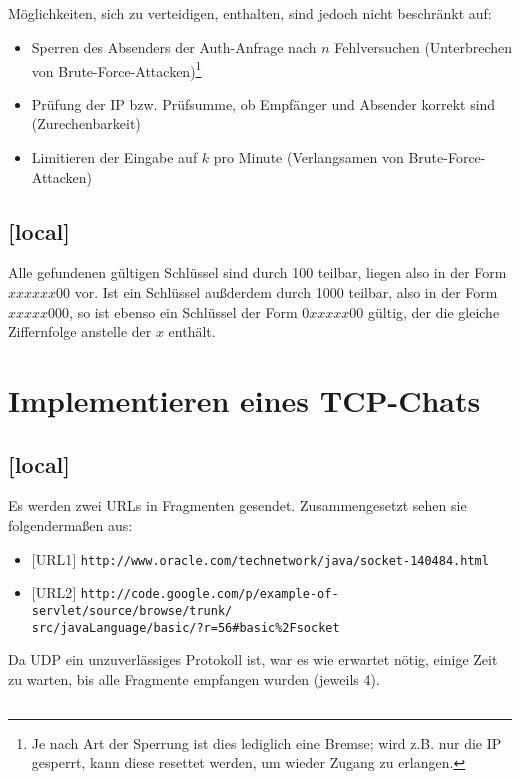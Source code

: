 \documentclass[twoside]{article}
\begin{document}
\subsection{}
Möglichkeiten, sich zu verteidigen, enthalten, sind jedoch nicht beschränkt auf:
\begin{itemize}
	\item Sperren des Absenders der Auth-Anfrage nach $n$ Fehlversuchen (Unterbrechen von Brute-Force-Attacken)\footnote{Je nach Art der Sperrung ist dies lediglich eine Bremse; wird z.B. nur die IP gesperrt, kann diese resettet werden, um wieder Zugang zu erlangen.}
	\item Prüfung der IP bzw. Prüfsumme, ob Empfänger und Absender korrekt sind (Zurechenbarkeit)
	\item Limitieren der Eingabe auf $k$ pro Minute (Verlangsamen von Brute-Force-Attacken)
\end{itemize}
\subsection{[local]}
Alle gefundenen gültigen Schlüssel sind durch 100 teilbar, liegen also in der Form $xxxxxx00$ vor.
Ist ein Schlüssel außderdem durch 1000 teilbar, also in der Form $xxxxx000$, so ist ebenso ein Schlüssel der Form $0xxxxx00$ gültig, der die gleiche Ziffernfolge anstelle der $x$ enthält.


\section{Implementieren eines TCP-Chats}
\subsection{[local]}
Es werden zwei URLs in Fragmenten gesendet.
Zusammengesetzt sehen sie folgendermaßen aus:
\begin{itemize}
	\item $[$URL1$]$ \texttt{http://www.oracle.com/technetwork/java/socket-140484.html}
	\item $[$URL2$]$ \texttt{http://code.google.com/p/example-of-servlet/source/browse/trunk/}\\\texttt{src/javaLanguage/basic/?r=56\#basic\%2Fsocket}
\end{itemize}
Da UDP ein unzuverlässiges Protokoll ist, war es wie erwartet nötig, einige Zeit zu warten, bis alle Fragmente empfangen wurden (jeweils 4).
\subsection{}
\end{document}
